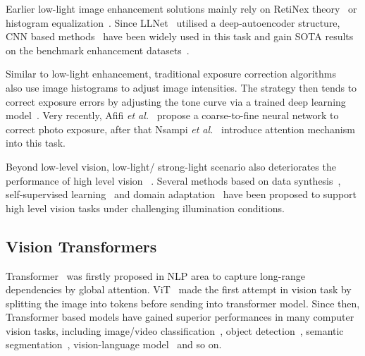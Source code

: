 \documentclass{bmvc2k}
\begin{document}
\noindent
Earlier low-light image enhancement solutions mainly rely on RetiNex theory~\cite{retinex} or histogram equalization~\cite{DIP,Global_HE}. Since LLNet~\cite{LLNet} utilised a deep-autoencoder structure, CNN based methods~\cite{Lv2018MBLLEN,KIND,RCT_ICCV21,zero_dce,Deep_LPF,DeepUPE_2019_CVPR,fu2022gan,Learn_adapt_light,SNR_2022_CVPR,Tan_enhancement} have been widely used in this task and gain SOTA results on the benchmark enhancement datasets~\cite{fivek_dataset,LOL_dataset}.  


Similar to low-light enhancement, traditional exposure
correction algorithms~\cite{exposure_ICCV2003,Exposure_ECCV12} also use image histograms to adjust image intensities. The strategy then tends to correct exposure errors by adjusting the tone curve via a trained deep learning model~\cite{YuNIPS18,park2018distort}. Very recently, Afifi \textit{et al.}~\cite{Exposure_2021_CVPR} propose a coarse-to-fine neural network to correct photo exposure, after that Nsampi \textit{et al.}~\cite{exposure_bmvc21} introduce attention mechanism into this task. 

Beyond low-level vision, low-light/ strong-light scenario also deteriorates the performance of high level vision ~\cite{ICCV_MAET,Hong_2021_BMVC,IJCV_21_lowface,Optical_Flow_in_dark,DBGAN_2021_WACV_strong_light,yolo-in-the-dark}. Several methods based on data synthesis~\cite{Optical_Flow_in_dark}, self-supervised learning~\cite{ICCV_MAET} and domain adaptation~\cite{yolo-in-the-dark} have been proposed to support high level vision tasks under challenging illumination conditions.






\vspace{-1mm}
\subsection{Vision Transformers}
Transformer~\cite{Transformer_NLP} was firstly proposed in NLP area to capture long-range dependencies by global attention. ViT~\cite{ViT} made the first attempt in vision task by splitting the image into tokens before sending into transformer model. Since then, Transformer based models have gained superior performances in many computer vision tasks, including image/video classification~\cite{swin,uniformer1}, object detection~\cite{DETR,zhang2022monodetr}, semantic segmentation~\cite{xie2021segformer}, vision-language model~\cite{clip,zhang2021tip} and so on.
\end{document}
